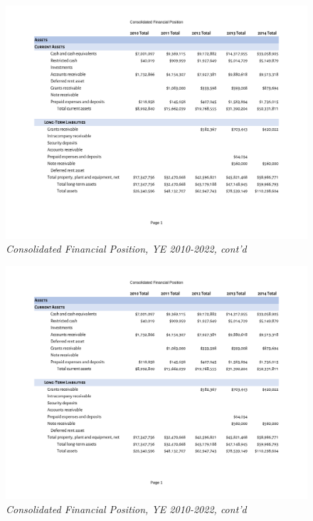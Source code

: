 \begin{figure}
  \caption*{\textit{Consolidated Financial Position, YE 2010-2022, cont'd}}
 \label{fig:consolidated_financial_position_2010-2022} %
 \includegraphics[page=2,width=\textheight]{Consolidated_Financial_Position_Years_2010-2022} %
\end{figure}

\begin{figure}
  \caption*{\textit{Consolidated Financial Position, YE 2010-2022, cont'd}}
 \label{fig:consolidated_financial_position_2010-2022} %
 \includegraphics[page=3,width=\textheight]{Consolidated_Financial_Position_Years_2010-2022} %
\end{figure}

